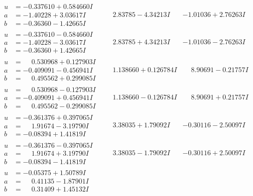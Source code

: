 \documentclass[1p]{elsarticle_modified}
\theoremstyle{definition}
\begin{document}
$$\begin{array}{c|c|c}
\begin{aligned}
u &= -0.337610 + 0.584660 I \\
a &= -1.40228 + 3.03617 I \\
b &= -0.36360 - 1.42665 I\end{aligned}
 & \phantom{-}2.83785 - 4.34213 I & -1.01036 + 2.76263 I \\ \hline\begin{aligned}
u &= -0.337610 - 0.584660 I \\
a &= -1.40228 - 3.03617 I \\
b &= -0.36360 + 1.42665 I\end{aligned}
 & \phantom{-}2.83785 + 4.34213 I & -1.01036 - 2.76263 I \\ \hline\begin{aligned}
u &= \phantom{-}0.530968 + 0.127903 I \\
a &= -0.409091 - 0.456941 I \\
b &= \phantom{-}0.495562 + 0.299085 I\end{aligned}
 & \phantom{-}1.138660 + 0.126784 I & \phantom{-}8.90691 - 0.21757 I \\ \hline\begin{aligned}
u &= \phantom{-}0.530968 - 0.127903 I \\
a &= -0.409091 + 0.456941 I \\
b &= \phantom{-}0.495562 - 0.299085 I\end{aligned}
 & \phantom{-}1.138660 - 0.126784 I & \phantom{-}8.90691 + 0.21757 I \\ \hline\begin{aligned}
u &= -0.361376 + 0.397065 I \\
a &= \phantom{-}1.91674 - 3.19790 I \\
b &= -0.08394 + 1.41819 I\end{aligned}
 & \phantom{-}3.38035 + 1.79092 I & -0.30116 - 2.50097 I \\ \hline\begin{aligned}
u &= -0.361376 - 0.397065 I \\
a &= \phantom{-}1.91674 + 3.19790 I \\
b &= -0.08394 - 1.41819 I\end{aligned}
 & \phantom{-}3.38035 - 1.79092 I & -0.30116 + 2.50097 I \\ \hline\begin{aligned}
u &= -0.05375 + 1.50789 I \\
a &= \phantom{-}0.41135 - 1.87901 I \\
b &= \phantom{-}0.31409 + 1.45132 I\end{aligned}

\end{array}$$
\end{document}
